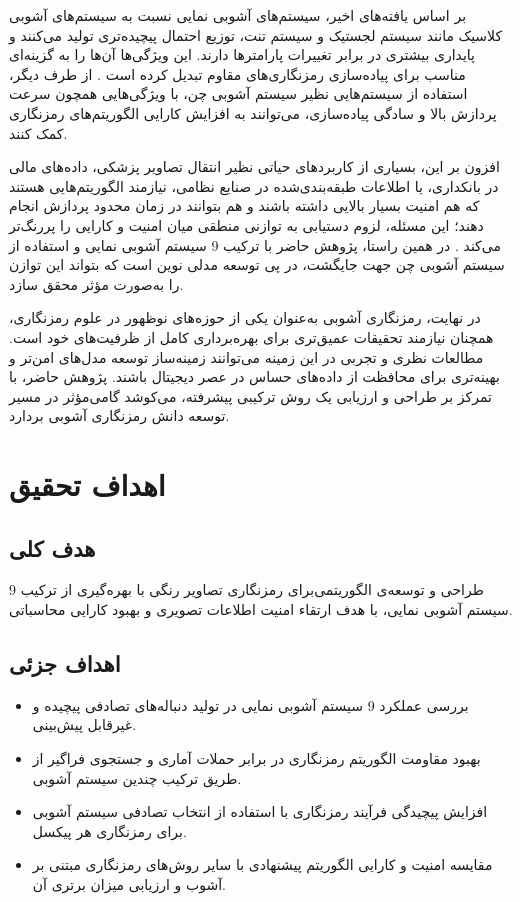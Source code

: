 \documentclass[a4paper,12pt]{report}
\renewcommand{\%}{\lr{\oldpercent}}
\begin{document}
بر اساس یافته‌های اخیر، سیستم‌های آشوبی نمایی نسبت به سیستم‌های آشوبی کلاسیک مانند سیستم لجستیک و سیستم تنت، توزیع احتمال پیچیده‌تری تولید می‌کنند و پایداری بیشتری در برابر تغییرات پارامترها دارند. این ویژگی‌ها آن‌ها را به گزینه‌ای مناسب برای پیاده‌سازی رمزنگاری‌های مقاوم تبدیل کرده است \cite{ref5}. از طرف دیگر، استفاده از سیستم‌هایی نظیر سیستم آشوبی چن، با ویژگی‌هایی همچون سرعت پردازش بالا و سادگی پیاده‌سازی، می‌توانند به افزایش کارایی الگوریتم‌های رمزنگاری کمک کنند.

افزون بر این، بسیاری از کاربردهای حیاتی نظیر انتقال تصاویر پزشکی، داده‌های مالی در بانکداری، یا اطلاعات طبقه‌بندی‌شده در صنایع نظامی، نیازمند الگوریتم‌هایی هستند که هم امنیت بسیار بالایی داشته باشند و هم بتوانند در زمان محدود پردازش انجام دهند؛ این مسئله، لزوم دستیابی به توازنی منطقی میان امنیت و کارایی را پررنگ‌تر می‌کند \cite{ref5}. در همین راستا، پژوهش حاضر با ترکیب 9 سیستم آشوبی نمایی و استفاده از سیستم آشوبی چن جهت جایگشت، در پی توسعه مدلی نوین است که بتواند این توازن را به‌صورت مؤثر محقق سازد.

در نهایت، رمزنگاری آشوبی به‌عنوان یکی از حوزه‌های نوظهور در علوم رمزنگاری، همچنان نیازمند تحقیقات عمیق‌تری برای بهره‌برداری کامل از ظرفیت‌های خود است. مطالعات نظری و تجربی در این زمینه می‌توانند زمینه‌ساز توسعه مدل‌های امن‌تر و بهینه‌تری برای محافظت از داده‌های حساس در عصر دیجیتال باشند. پژوهش حاضر، با تمرکز بر طراحی و ارزیابی یک روش ترکیبی پیشرفته، می‌کوشد گامی‌مؤثر در مسیر توسعه دانش رمزنگاری آشوبی بردارد.

\section{اهداف تحقیق}
\subsection{هدف کلی}
طراحی و توسعه‌ی الگوریتمی‌برای رمزنگاری تصاویر رنگی با بهره‌گیری از ترکیب 9 سیستم آشوبی نمایی، با هدف ارتقاء امنیت اطلاعات تصویری و بهبود کارایی محاسباتی.

\subsection{اهداف جزئی}
\begin{itemize}
    \item بررسی عملکرد 9 سیستم آشوبی نمایی در تولید دنباله‌های تصادفی پیچیده و غیرقابل پیش‌بینی.
    \item بهبود مقاومت الگوریتم رمزنگاری در برابر حملات آماری و جستجوی فراگیر از طریق ترکیب چندین سیستم آشوبی.
    \item افزایش پیچیدگی فرآیند رمزنگاری با استفاده از انتخاب تصادفی سیستم آشوبی برای رمزنگاری هر پیکسل.
    \item مقایسه امنیت و کارایی الگوریتم پیشنهادی با سایر روش‌های رمزنگاری مبتنی بر آشوب و ارزیابی میزان برتری آن.
\end{itemize}
\end{document}
